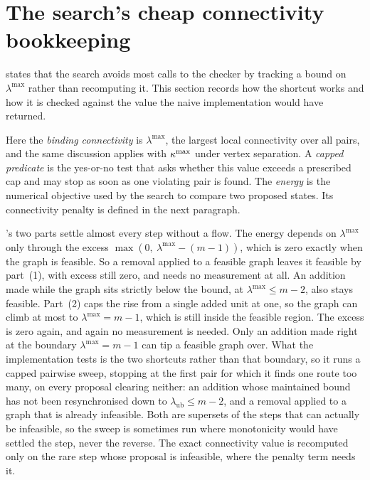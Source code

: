 

\section{The search's cheap connectivity bookkeeping}\label{sec:cheap-checker}

 states that the search avoids most calls to the checker by tracking a bound on $\lambda^{\max}$ rather than recomputing it. This section records how the shortcut works and how it is checked against the value the naive implementation would have returned.

Here the \emph{binding connectivity} is $\lambda^{\max}$, the largest local
connectivity over all pairs, and the same discussion applies with $\kappa^{\max}$
under vertex separation. A \emph{capped predicate} is the yes-or-no test
that asks whether this value exceeds a prescribed cap and may stop as soon as
one violating pair is found. The \emph{energy} is the numerical objective used
by the search to compare two proposed states. Its connectivity penalty is
defined in the next paragraph.

's two parts settle almost every step without a flow. The energy depends on $\lambda^{\max}$ only through the excess $\max(0,\ \lambda^{\max} - (m-1))$, which is zero exactly when the graph is feasible. So a removal applied to a feasible graph leaves it feasible by part~(1), with excess still zero, and needs no measurement at all. An addition made while the graph sits strictly below the bound, at $\lambda^{\max} \le m - 2$, also stays feasible. Part~(2) caps the rise from a single added unit at one, so the graph can climb at most to $\lambda^{\max} = m - 1$, which is still inside the feasible region. The excess is zero again, and again no measurement is needed. Only an addition made right at the boundary $\lambda^{\max} = m - 1$ can tip a feasible graph over. What the implementation tests is the two shortcuts rather than that boundary, so it runs a capped pairwise sweep, stopping at the first pair for which it finds one route too many, on every proposal clearing neither: an addition whose maintained bound has not been resynchronised down to $\lambda_{\mathrm{ub}} \le m-2$, and a removal applied to a graph that is already infeasible. Both are supersets of the steps that can actually be infeasible, so the sweep is sometimes run where monotonicity would have settled the step, never the reverse. The exact connectivity value is recomputed only on the rare step whose proposal is infeasible, where the penalty term needs it.


